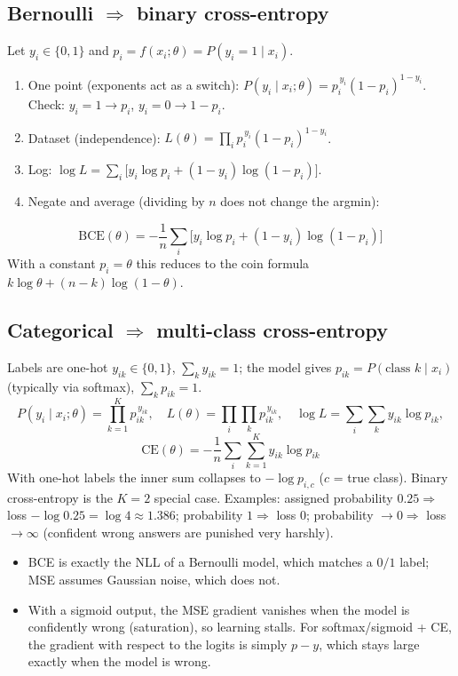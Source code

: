 \documentclass[11pt,a4paper]{article}
\begin{document}
\subsection{Bernoulli $\Rightarrow$ binary cross-entropy}
Let $y_i\in\{0,1\}$ and $p_i=f(x_i;\theta)=P(y_i=1\mid x_i)$.
\begin{enumerate}[nosep]
  \item One point (exponents act as a switch):
  $P(y_i\mid x_i;\theta)=p_i^{\,y_i}(1-p_i)^{1-y_i}$. Check: $y_i=1\to p_i$, $y_i=0\to1-p_i$.
  \item Dataset (independence): $L(\theta)=\prod_i p_i^{\,y_i}(1-p_i)^{1-y_i}$.
  \item Log: $\log L=\sum_i\big[y_i\log p_i+(1-y_i)\log(1-p_i)\big]$.
  \item Negate and average (dividing by $n$ does not change the argmin):
\end{enumerate}
\[
\boxed{\mathrm{BCE}(\theta)=-\frac1n\sum_i\big[y_i\log p_i+(1-y_i)\log(1-p_i)\big]}
\]
With a constant $p_i=\theta$ this reduces to the coin formula $k\log\theta+(n-k)\log(1-\theta)$.

\subsection{Categorical $\Rightarrow$ multi-class cross-entropy}
Labels are one-hot $y_{ik}\in\{0,1\}$, $\sum_k y_{ik}=1$; the model gives $p_{ik}=P(\text{class }k\mid x_i)$ (typically via softmax), $\sum_k p_{ik}=1$.
\[
P(y_i\mid x_i;\theta)=\prod_{k=1}^K p_{ik}^{\,y_{ik}},\quad
L(\theta)=\prod_i\prod_k p_{ik}^{\,y_{ik}},\quad
\log L=\sum_i\sum_k y_{ik}\log p_{ik},
\]
\[
\boxed{\mathrm{CE}(\theta)=-\frac1n\sum_i\sum_{k=1}^K y_{ik}\log p_{ik}}
\]
With one-hot labels the inner sum collapses to $-\log p_{i,c}$ ($c$ = true class). Binary cross-entropy is the $K=2$ special case. Examples: assigned probability $0.25\Rightarrow$ loss $-\log0.25=\log4\approx1.386$; probability $1\Rightarrow$ loss $0$; probability $\to0\Rightarrow$ loss $\to\infty$ (confident wrong answers are punished very harshly).

\begin{interview}
\begin{itemize}[nosep]
  \item BCE is exactly the NLL of a Bernoulli model, which matches a $0/1$ label; MSE assumes Gaussian noise, which does not.
  \item With a sigmoid output, the MSE gradient vanishes when the model is confidently wrong (saturation), so learning stalls. For softmax/sigmoid + CE, the gradient with respect to the logits is simply $p-y$, which stays large exactly when the model is wrong.
\end{itemize}
\end{interview}
\end{document}
